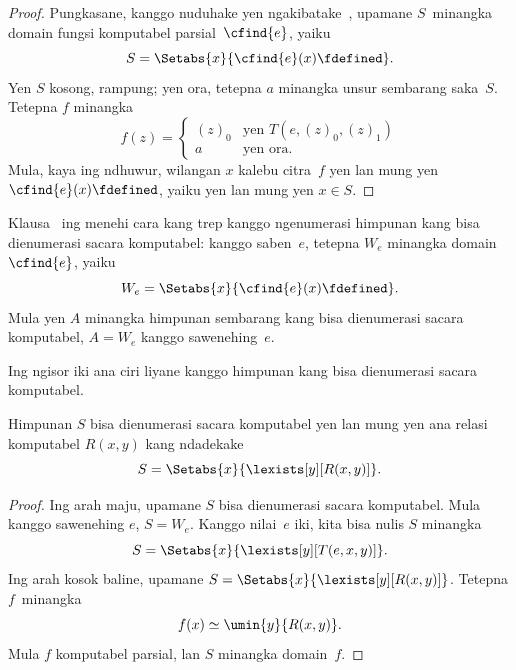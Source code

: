 \documentclass[../../../include/open-logic-section]{subfiles}
\begin{document}
\begin{proof}
Pungkasane, kanggo nuduhake yen
 ngakibatake~,
upamane $S$~minangka domain fungsi komputabel
parsial~$\cfind{e}$, yaiku
\[
S = \Setabs{x}{\cfind{e}(x) \fdefined}.
\]
Yen $S$ kosong, rampung; yen ora,
tetepna $a$ minangka unsur sembarang
saka~$S$. Tetepna $f$ minangka
\[
f(z) = \begin{cases}
(z)_0 & \text{yen $T(e,(z)_0,(z)_1)$} \\
a & \text{yen ora.}
\end{cases}
\]
Mula, kaya ing ndhuwur, wilangan $x$
kalebu citra~$f$ yen lan mung yen
$\cfind{e}(x) \fdefined$, yaiku yen lan
mung yen $x \in S$. 
\end{proof}

Klausa~ ing
 menehi cara kang trep
kanggo ngenumerasi himpunan kang bisa
dienumerasi sacara komputabel: kanggo
saben~$e$, tetepna $W_e$ minangka domain
$\cfind{e}$, yaiku
\[
W_e = \Setabs{x}{\cfind{e}(x) \fdefined}.
\] 
Mula yen $A$ minangka himpunan sembarang
kang bisa dienumerasi sacara komputabel,
$A = W_e$ kanggo sawenehing~$e$.

Ing ngisor iki ana ciri liyane kanggo himpunan
kang bisa dienumerasi sacara komputabel.

\begin{thm}
Himpunan $S$ bisa dienumerasi sacara komputabel
yen lan mung yen ana relasi komputabel
$R(x,y)$ kang ndadekake
\[
S = \Setabs{ x }{ \lexists[y][R(x,y)] }.
\]
\end{thm}

\begin{proof}
Ing arah maju, upamane $S$ bisa dienumerasi
sacara komputabel. Mula kanggo sawenehing
$e$, $S = W_e$. Kanggo nilai~$e$ iki,
kita bisa nulis $S$ minangka
\[
S = \Setabs{ x }{ \lexists[y][T(e, x, y)] }.
\]
Ing arah kosok baline, upamane
$S = \Setabs{ x }{
  \lexists[y][R(x, y)] }$. Tetepna $f$~minangka
\[
f(x) \simeq \umin{y}{R(x, y)}.
\]
Mula $f$ komputabel parsial, lan $S$
minangka domain~$f$.
\end{proof}
\end{document}
